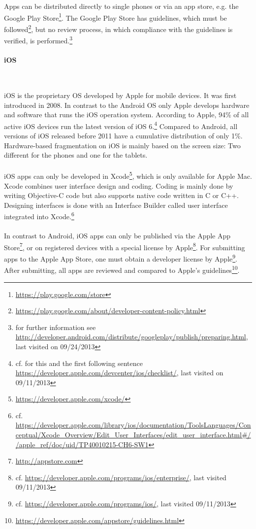 \\
\\
Apps can be distributed directly to single phones or via an app store, e.g. the Google Play Store\footnote{\url{https://play.google.com/store}}. The Google Play Store has guidelines, which must be followed\footnote{\url{https://play.google.com/about/developer-content-policy.html}}, but no review process, in which compliance with the guidelines is verified, is performed.\footnote{for further information see \url{http://developer.android.com/distribute/googleplay/publish/preparing.html}, last visited on 09/24/2013}

\paragraph{iOS}$\;$

\vspace{0.75em}
iOS is the proprietary OS developed by Apple for mobile devices. It was first introduced in 2008. In contrast to the Android OS only Apple develops hardware and software that runs the iOS operation system. According to Apple, 94\% of all active iOS devices run the latest version of iOS 6.\footnote{cf. for this and the first following sentence \url{https://developer.apple.com/devcenter/ios/checklist/}, last visited on 09/11/2013} Compared to Android, all versions of iOS released before 2011 have a cumulative distribution of only 1\%. Hardware-based fragmentation on iOS is mainly based on the screen size: Two different for the phones and one for the tablets.
\\
\\
iOS apps can only be developed in Xcode\footnote{\url{https://developer.apple.com/xcode/}}, which is only available for Apple Mac. Xcode combines user interface design and coding. Coding is mainly done by writing Objective-C code but also supports native code written in C or C++. Designing interfaces is done with an Interface Builder called user interface integrated into Xcode.\footnote{cf. \url{https://developer.apple.com/library/ios/documentation/ToolsLanguages/Conceptual/Xcode_Overview/Edit_User_Interfaces/edit_user_interface.html\#//apple_ref/doc/uid/TP40010215-CH6-SW1}}
\\
\\
In contrast to Android, iOS apps can only be published via the Apple App Store\footnote{\url{http://appstore.com}}, or on registered devices with a special license by Apple\footnote{cf. \url{https://developer.apple.com/programs/ios/enterprise/}, last visited 09/11/2013}. For submitting apps to the Apple App Store, one must obtain a developer license by Apple\footnote{cf. \url{https://developer.apple.com/programs/ios/}, last visited 09/11/2013}. After submitting, all apps are reviewed and compared to Apple's guidelines\footnote{\url{https://developer.apple.com/appstore/guidelines.html}}.

